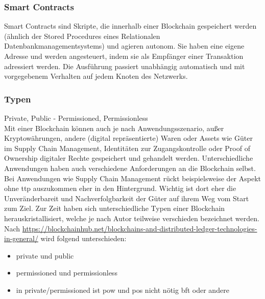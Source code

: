     \subsubsection{Smart Contracts}
    \label{sec:sota_blockchain_sc}
        Smart Contracts sind Skripte, die innerhalb einer Blockchain gespeichert werden (ähnlich der Stored Procedures eines Relationalen Datenbankmanagementsystems) und agieren autonom. 
        Sie haben eine eigene Adresse und werden angesteuert, indem sie als Empfänger einer Transaktion adressiert werden.
        Die Ausführung passiert unabhängig automatisch und mit vorgegebenem Verhalten auf jedem Knoten des Netzwerks.
        \cite{Christidis2016} 
    
    \subsubsection{Typen}
    \label{sec:sota_blockchain_types}
        Private, Public - Permissioned, Permissionless
        \medskip\\
        Mit einer Blockchain können auch je nach Anwendungsszenario, außer Kryptowährungen, andere (digital repräsentierte) Waren oder Assets wie Güter im Supply Chain Management\cite{Underwood2016}, Identitäten zur Zugangskontrolle\cite{Kshetri2017} oder Proof of Ownership digitaler Rechte\cite{Wuest2017} gespeichert und gehandelt werden. 
        Unterschiedliche Anwendungen haben auch verschiedene Anforderungen an die Blockchain selbst. 
        Bei Anwendungen wie Supply Chain Management rückt beispielsweise der Aspekt ohne \gls{ttp} auszukommen eher in den Hintergrund. 
        Wichtig ist dort eher die Unveränderbareit und Nachverfolgbarkeit der Güter auf ihrem Weg vom Start zum Ziel. 
        Zur Zeit haben sich unterschiedliche Typen einer Blockchain herauskristallisiert, welche je nach Autor teilweise verschieden bezeichnet werden.
        Nach \sloppy\url{https://blockchainhub.net/blockchains-and-distributed-ledger-technologies-in-general/} wird folgend unterschieden:
        \begin{itemize}
            \item private und public
            \item permissioned und permissionless
        \end{itemize}
        
        \begin{itemize}[noitemsep]
            \item in private/\-permissioned ist \gls{pow} und \gls{pos} nicht nötig \textrightarrow \gls{bft} oder andere
        \end{itemize}
    
